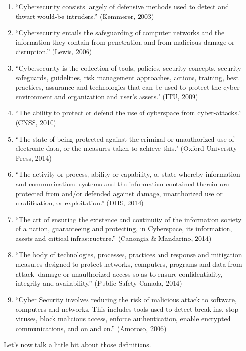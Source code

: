 \begin{enumerate}
  \item “Cybersecurity consists largely of defensive methods used to
    detect and thwart would-be intruders.” (Kemmerer, 2003)
  \item “Cybersecurity entails the safeguarding of computer networks and
    the information they contain from penetration and from malicious
    damage or disruption.” (Lewis, 2006)
  \item “Cybersecurity is the collection of tools, policies, security
    concepts, security safeguards, guidelines, risk management
    approaches, actions, training, best practices, assurance and
    technologies that can be used to protect the cyber environment and
    organization and user's assets.” (ITU, 2009)
  \item “The ability to protect or defend the use of cyberspace from
    cyber-attacks.” (CNSS, 2010)
  \item “The state of being protected against the criminal or
    unauthorized use of electronic data, or the measures taken to
    achieve this.” (Oxford University Press, 2014)
  \item “The activity or process, ability or capability, or state
    whereby information and communications systems and the information
    contained therein are protected from and/or defended against damage,
    unauthorized use or modification, or exploitation.” (DHS, 2014)
  \item “The art of ensuring the existence and continuity of the
    information society of a nation, guaranteeing and protecting, in
    Cyberspace, its information, assets and critical infrastructure.”
    (Canongia \& Mandarino, 2014)
  \item “The body of technologies, processes, practices and response and
    mitigation measures designed to protect networks, computers,
    programs and data from attack, damage or unauthorized access so as
    to ensure confidentiality, integrity and availability.” (Public
    Safety Canada, 2014) 
  \item “Cyber Security involves reducing the risk of malicious attack
    to software, computers and networks. This includes tools used to
    detect break-ins, stop viruses, block malicious access, enforce
    authentication, enable encrypted communications, and on and on.”
    (Amoroso, 2006)
\end{enumerate}

Let's now talk a little bit about those definitions.

